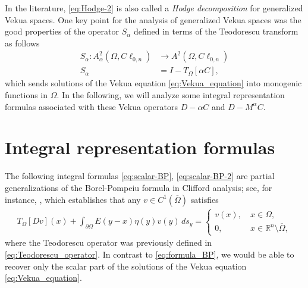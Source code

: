 \documentclass[12pt]{article}
\def\R{\mathbb{R}}
\begin{document}
In the literature, \eqref{eq:Hodge-2} is also called a \textit{Hodge decomposition} for generalized Vekua spaces.
One key point for the analysis of generalized Vekua spaces was the good properties of the operator $S_{\alpha}$ defined in terms of the Teodorescu transform as follows
\begin{align}\label{eq:invariant-operator}
S_{\alpha}\colon A_{\alpha}^2(\Omega,C\ell_{0,n})&\rightarrow A^2(\Omega,C\ell_{0,n})\\
\nonumber S_{\alpha}&=I-T_{\Omega}[\alpha C], 
\end{align}
which sends solutions of the Vekua equation \eqref{eq:Vekua_equation} into monogenic functions in $\Omega$. In the following, we will analyze some integral representation formulas associated with these Vekua operators $D-\alpha C$ and $D-M^{\alpha}C$.





\section{Integral representation formulas}\label{sec:integral}
The following integral formulas \eqref{eq:scalar-BP}, \eqref{eq:scalar-BP-2} are partial generalizations of the Borel-Pompeiu formula in Clifford analysis; see, for instance, \cite[Th.\ 7.8]{GuHaSpr2008}, which establishes that any $v\in C^1(\overline{\Omega})$ satisfies
\begin{align}\label{eq:formula_BP}
   T_{\Omega}[Dv](x)+\int_{\partial\Omega}E(y-x)\eta(y)v(y)\, ds_y= \left\{
   \begin{array}{ll}
      v(x), \ & x\in \Omega,\\
      0,           & x\in \R^n\setminus \overline{\Omega},
   \end{array}
\right.
\end{align} 
where the Teodorescu operator was previously defined in \eqref{eq:Teodorescu_operator}. In contrast to \eqref{eq:formula_BP}, we would be able to recover only the scalar part of the solutions of the Vekua equation \eqref{eq:Vekua_equation}.
\end{document}
